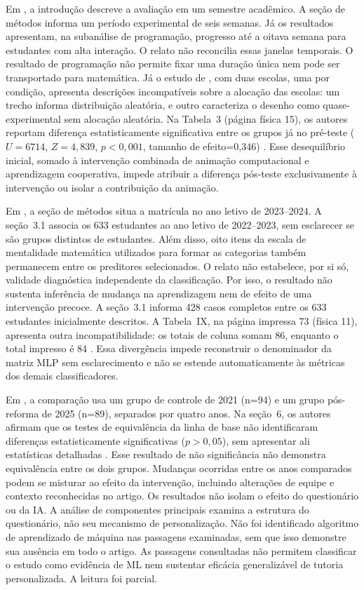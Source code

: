 Em , a introdução descreve a avaliação em um semestre acadêmico. A seção de métodos informa um período experimental de seis semanas. Já os resultados apresentam, na subanálise de programação, progresso até a oitava semana para estudantes com alta interação. O relato não reconcilia essas janelas temporais. O resultado de programação não permite fixar uma duração única nem pode ser transportado para matemática. Já o estudo de , com duas escolas, uma por condição, apresenta descrições incompatíveis sobre a alocação das escolas: um trecho informa distribuição aleatória, e outro caracteriza o desenho como quase-experimental sem alocação aleatória. Na Tabela~3 (página física 15), os autores reportam diferença estatisticamente significativa entre os grupos já no pré-teste ($U=6714$, $Z=4{,}839$, $p<0{,}001$, tamanho de efeito=0{,}346) \cite[Tabela~3]{Enhancing2025_012}. Esse desequilíbrio inicial, somado à intervenção combinada de animação computacional e aprendizagem cooperativa, impede atribuir a diferença pós-teste exclusivamente à intervenção ou isolar a contribuição da animação.

Em , a seção de métodos situa a matrícula no ano letivo de 2023--2024. A seção~3.1 associa os 633 estudantes ao ano letivo de 2022--2023, sem esclarecer se são grupos distintos de estudantes. Além disso, oito itens da escala de mentalidade matemática utilizados para formar as categorias também permanecem entre os preditores selecionados. O relato não estabelece, por si só, validade diagnóstica independente da classificação. Por isso, o resultado não sustenta inferência de mudança na aprendizagem nem de efeito de uma intervenção precoce. A seção~3.1 informa 428 casos completos entre os 633 estudantes inicialmente descritos. A Tabela~IX, na página impressa 73 (física 11), apresenta outra incompatibilidade: os totais de coluna somam 86, enquanto o total impresso é 84 \cite{Echeveria2025_6920}. Essa divergência impede reconstruir o denominador da matriz MLP sem esclarecimento e não se estende automaticamente às métricas dos demais classificadores.

Em , a comparação usa um grupo de controle de 2021 (n=94) e um grupo pós-reforma de 2025 (n=89), separados por quatro anos. Na seção~6, os autores afirmam que os testes de equivalência da linha de base não identificaram diferenças estatisticamente significativas ($p>0{,}05$), sem apresentar ali estatísticas detalhadas \cite[seção~6]{UniversityMathematics2026_6919}. Esse resultado de não significância não demonstra equivalência entre os dois grupos. Mudanças ocorridas entre os anos comparados podem se misturar ao efeito da intervenção, incluindo alterações de equipe e contexto reconhecidas no artigo. Os resultados não isolam o efeito do questionário ou da IA. A análise de componentes principais examina a estrutura do questionário, não seu mecanismo de personalização. Não foi identificado algoritmo de aprendizado de máquina nas passagens examinadas, sem que isso demonstre sua ausência em todo o artigo. As passagens consultadas não permitem classificar o estudo como evidência de ML nem sustentar eficácia generalizável de tutoria personalizada. A leitura foi parcial.

